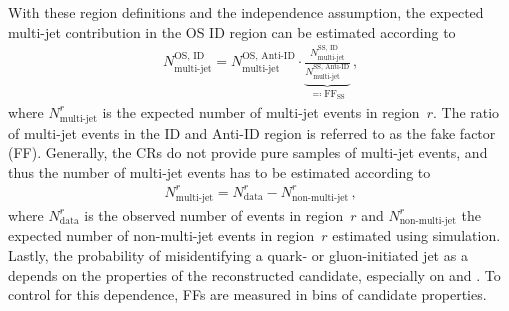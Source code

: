 With these region definitions and the independence assumption, the expected
multi-jet contribution in the OS ID region can be estimated according to
\begin{align*}
  N_\text{multi-jet}^{\text{OS, ID}} =
  N_\text{multi-jet}^{\text{OS, Anti-ID}}
  \cdot
  \underbrace{\frac{N_\text{multi-jet}^{\text{SS, ID}}}
  {N_\text{multi-jet}^{\text{SS, Anti-ID}}}}
  _{\eqqcolon \text{FF}_{\text{SS}}} \,\text{,}
\end{align*}
where $N_\text{multi-jet}^{r}$ is the expected number of multi-jet events in
region~$r$. The ratio of multi-jet events in the ID and Anti-ID region is
referred to as the fake factor (FF).
Generally, the CRs do not provide pure samples of multi-jet events, and thus the
number of multi-jet events has to be estimated according to
\begin{align*}
  N_\text{multi-jet}^{r} = N_\text{data}^{r} - N_\text{non-multi-jet}^{r} \,\text{,}
\end{align*}
where $N_\text{data}^{r}$ is the observed number of events in region~$r$ and
$N_\text{non-multi-jet}^{r}$ the expected number of non-multi-jet events in
region~$r$ estimated using simulation. Lastly, the probability of misidentifying
a quark- or gluon-initiated jet as a \tauhadvis depends on the properties of the
reconstructed \tauhadvis candidate, especially on \Ntracks and \pT. To control
for this dependence, FFs are measured in bins of \tauhadvis candidate
properties.


